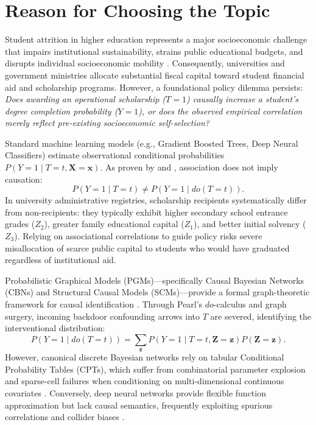 \section{Reason for Choosing the Topic}

Student attrition in higher education represents a major socioeconomic challenge that impairs institutional sustainability, strains public educational budgets, and disrupts individual socioeconomic mobility \parencite{martins2021predicting}. Consequently, universities and government ministries allocate substantial fiscal capital toward student financial aid and scholarship programs. However, a foundational policy dilemma persists: \emph{Does awarding an operational scholarship ($T=1$) causally increase a student's degree completion probability ($Y=1$), or does the observed empirical correlation merely reflect pre-existing socioeconomic self-selection?}

Standard machine learning models (e.g., Gradient Boosted Trees, Deep Neural Classifiers) estimate observational conditional probabilities $P(Y=1 \mid T=t, \mathbf{X}=\mathbf{x})$. As proven by \textcite{pearl2009causality} and \textcite{hernan2020causal}, association does not imply causation:
\begin{equation}
    P(Y=1 \mid T=t) \neq P(Y=1 \mid do(T=t)).
    \label{eq:pearl_inequality}
\end{equation}
In university administrative registries, scholarship recipients systematically differ from non-recipients: they typically exhibit higher secondary school entrance grades ($Z_2$), greater family educational capital ($Z_1$), and better initial solvency ($Z_3$). Relying on associational correlations to guide policy risks severe misallocation of scarce public capital to students who would have graduated regardless of institutional aid.

Probabilistic Graphical Models (PGMs)---specifically Causal Bayesian Networks (CBNs) and Structural Causal Models (SCMs)---provide a formal graph-theoretic framework for causal identification \parencite{pearl2009causality, ankan2015pgmpy}. Through Pearl's $do$-calculus and graph surgery, incoming backdoor confounding arrows into $T$ are severed, identifying the interventional distribution:
\begin{equation}
    P(Y=1 \mid do(T=t)) = \sum_{\mathbf{z}} P(Y=1 \mid T=t, \mathbf{Z}=\mathbf{z}) P(\mathbf{Z}=\mathbf{z}).
    \label{eq:backdoor_formula_intro}
\end{equation}
However, canonical discrete Bayesian networks rely on tabular Conditional Probability Tables (CPTs), which suffer from combinatorial parameter explosion and sparse-cell failures when conditioning on multi-dimensional continuous covariates \parencite{koller2009pgm}. Conversely, deep neural networks provide flexible function approximation but lack causal semantics, frequently exploiting spurious correlations and collider biases \parencite{shi2019dragonnet, sharma2020dowhy}.

